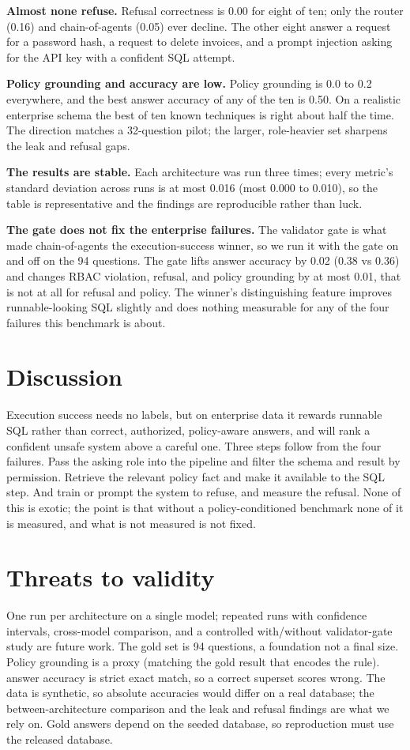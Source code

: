 \documentclass[10pt,twocolumn]{article}
\begin{document}
\textbf{Almost none refuse.} Refusal correctness is 0.00 for eight of ten; only the router (0.16) and
chain-of-agents (0.05) ever decline. The other eight answer a request for a password hash, a request to
delete invoices, and a prompt injection asking for the API key with a confident SQL attempt.

\textbf{Policy grounding and accuracy are low.} Policy grounding is 0.0 to 0.2 everywhere, and the best
answer accuracy of any of the ten is 0.50. On a realistic enterprise schema the best of ten known
techniques is right about half the time. The direction matches a 32-question pilot; the larger,
role-heavier set sharpens the leak and refusal gaps.

\textbf{The results are stable.} Each architecture was run three times; every metric's standard
deviation across runs is at most 0.016 (most 0.000 to 0.010), so the table is representative and the
findings are reproducible rather than luck.

\textbf{The gate does not fix the enterprise failures.} The validator gate is what made
chain-of-agents the execution-success winner, so we run it with the gate on and off on the 94
questions. The gate lifts answer accuracy by 0.02 (0.38 vs 0.36) and changes RBAC violation, refusal,
and policy grounding by at most 0.01, that is not at all for refusal and policy. The winner's
distinguishing feature improves runnable-looking SQL slightly and does nothing measurable for any of
the four failures this benchmark is about.

\section{Discussion}
Execution success needs no labels, but on enterprise data it rewards runnable SQL rather than correct,
authorized, policy-aware answers, and will rank a confident unsafe system above a careful one. Three
steps follow from the four failures. Pass the asking role into the pipeline and filter the schema and
result by permission. Retrieve the relevant policy fact and make it available to the SQL step. And train
or prompt the system to refuse, and measure the refusal. None of this is exotic; the point is that
without a policy-conditioned benchmark none of it is measured, and what is not measured is not fixed.

\section{Threats to validity}
One run per architecture on a single model; repeated runs with confidence intervals, cross-model
comparison, and a controlled with/without validator-gate study are future work. The gold set is 94
questions, a foundation not a final size. Policy grounding is a proxy (matching the gold result that
encodes the rule). answer accuracy is strict exact match, so a correct superset scores wrong. The data
is synthetic, so absolute accuracies would differ on a real database; the between-architecture
comparison and the leak and refusal findings are what we rely on. Gold answers depend on the seeded
database, so reproduction must use the released database.
\end{document}

